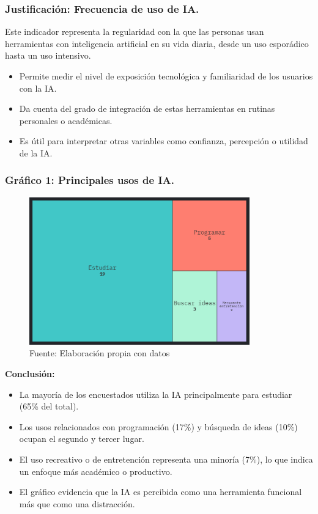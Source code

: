 \documentclass[12pt, a4paper]{article}
\begin{document}
\subsubsection*{Justificación: Frecuencia de uso de IA.}
Este indicador representa la regularidad con la que las personas usan herramientas con inteligencia artificial en su vida diaria, desde un uso esporádico hasta un uso intensivo.

\begin{itemize}
    \item Permite medir el nivel de exposición tecnológica y familiaridad de los usuarios con la IA.
    \item Da cuenta del grado de integración de estas herramientas en rutinas personales o académicas.
    \item Es útil para interpretar otras variables como confianza, percepción o utilidad de la IA.
\end{itemize}


\subsubsection*{Gráfico 1:  Principales usos de IA.}
\begin{figure}[H]
    \centering
    \includegraphics[width=0.85\textwidth]{Graficos/Treemap_Uso_IA_FC.png}
    \caption[1]{Fuente: Elaboración propia con datos}
\end{figure}

\textbf{Conclusión:}
\begin{itemize}
    \item La mayoría de los encuestados utiliza la IA principalmente para estudiar (65\% del total).
    \item Los usos relacionados con programación (17\%) y búsqueda de ideas (10\%) ocupan el segundo y tercer lugar.
    \item El uso recreativo o de entretención representa una minoría (7\%), lo que indica un enfoque más académico o productivo.
    \item El gráfico evidencia que la IA es percibida como una herramienta funcional más que como una distracción.
\end{itemize}
\end{document}
